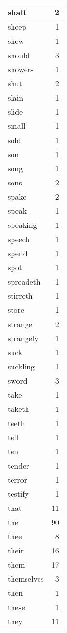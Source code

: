 \begin{center}
\begin{longtable}{l|r}
shalt & 2 \\ \hline
sheep & 1 \\ \hline
shew & 1 \\ \hline
should & 3 \\ \hline
showers & 1 \\ \hline
shut & 2 \\ \hline
slain & 1 \\ \hline
slide & 1 \\ \hline
small & 1 \\ \hline
sold & 1 \\ \hline
son & 1 \\ \hline
song & 1 \\ \hline
sons & 2 \\ \hline
spake & 2 \\ \hline
speak & 1 \\ \hline
speaking & 1 \\ \hline
speech & 1 \\ \hline
spend & 1 \\ \hline
spot & 1 \\ \hline
spreadeth & 1 \\ \hline
stirreth & 1 \\ \hline
store & 1 \\ \hline
strange & 2 \\ \hline
strangely & 1 \\ \hline
suck & 1 \\ \hline
suckling & 1 \\ \hline
sword & 3 \\ \hline
take & 1 \\ \hline
taketh & 1 \\ \hline
teeth & 1 \\ \hline
tell & 1 \\ \hline
ten & 1 \\ \hline
tender & 1 \\ \hline
terror & 1 \\ \hline
testify & 1 \\ \hline
that & 11 \\ \hline
the & 90 \\ \hline
thee & 8 \\ \hline
their & 16 \\ \hline
them & 17 \\ \hline
themselves & 3 \\ \hline
then & 1 \\ \hline
these & 1 \\ \hline
they & 11 \\ \hline

\end{longtable}
\end{center}
